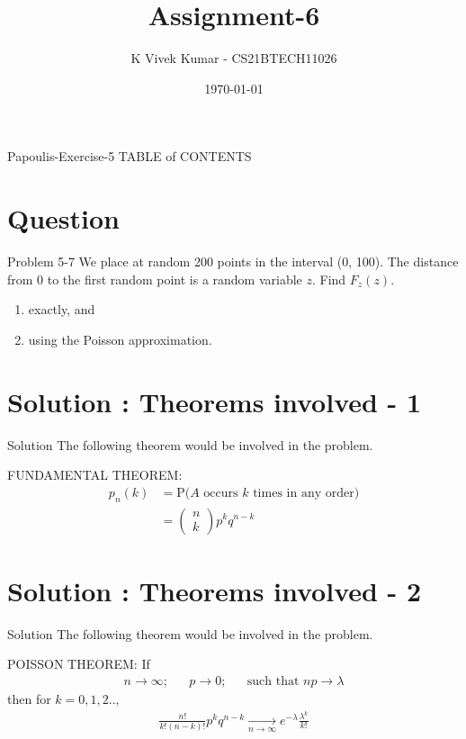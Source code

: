 \documentclass{beamer}
\title{Assignment-6}
\author{K Vivek Kumar - CS21BTECH11026}
\date{\today}
\begin{document}
\begin{frame}
    \titlepage 
\end{frame}

\logo{}


\begin{frame}{Papoulis-Exercise-5}
TABLE of CONTENTS
    \tableofcontents
\end{frame}


\section{Question}
\begin{frame}{Problem 5-7}
We place at random 200 points in the interval (0, 100). The distance from 0 to the first random point is a random variable $z$. Find $F_{z}(z)$.
	\begin{enumerate}
	\item exactly, and 
	\item using the Poisson approximation. 
	\end{enumerate}
\end{frame}


\section{Solution : Theorems involved - 1}
\begin{frame}{Solution}
The following theorem would be involved in the problem.\\
\begin{block}{FUNDAMENTAL THEOREM:}
\begin{align}
p_{n}(k)&=\text{P($A$ occurs $k$ times in any order)} \\
        &= \begin{pmatrix}
n\\
k
\end{pmatrix}p^{k}q^{n-k}
\end{align}
    \end{block}
\end{frame} 
\section{Solution : Theorems involved - 2}
\begin{frame}{Solution}
The following theorem would be involved in the problem.\\
\begin{block}{POISSON THEOREM:} If 
\begin{align*}
n \to \infty; && p \to 0; && \text{such that } np \to \lambda
\end{align*}
then for $k=0,1,2..$,
\begin{align}
\frac{n!}{k!(n-k)!}p^{k}q^{n-k}\xrightarrow[\text{$n\to \infty$}]{} e^{-\lambda}\frac{\lambda^{k}}{k!}
\end{align}
    \end{block}
\end{frame}
\end{document}
